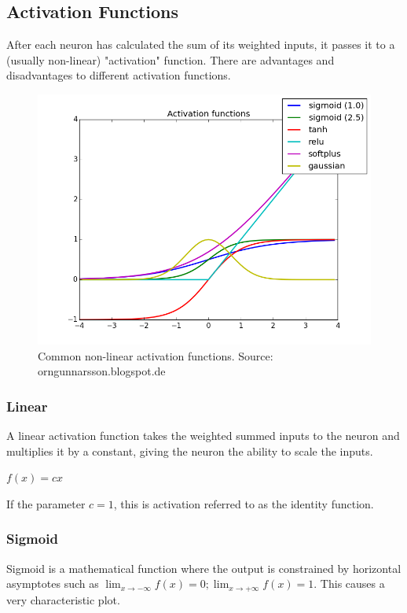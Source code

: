 \subsection{Activation Functions}
\label{activation}

After each neuron has calculated the sum of its weighted inputs, it passes it to a (usually non-linear) "activation" function.  There are advantages and disadvantages to different activation functions.



\begin{figure}[h]
    \centering
	\includegraphics[width=.7\textwidth]{./images/illustrations/ActivationFunctions}
    \caption{Common non-linear activation functions. Source: orngunnarsson.blogspot.de}
    \label{fig:actviation}
\end{figure}




\subsubsection{Linear}

A linear activation function takes the weighted summed inputs to the neuron and multiplies it by a constant, giving the neuron the ability to scale the inputs.

{\centering
  $f(x)=cx$\par
}

If the parameter $c = 1$, this is activation referred to as the identity function.


\subsubsection{Sigmoid}

Sigmoid is a mathematical function where the output is constrained by horizontal asymptotes such as $\displaystyle \lim_{x\to - \infty} f(x) =  0; \lim_{x\to + \infty} f(x) =  1$. This causes a very characteristic plot. 

